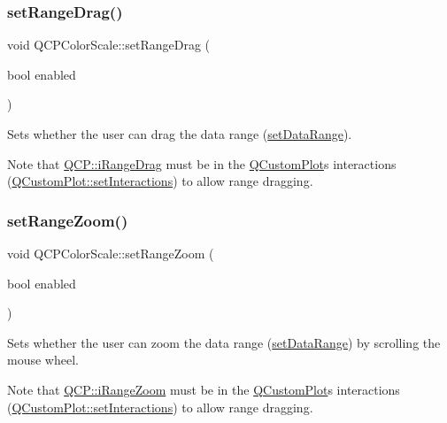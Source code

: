 \subsubsection{\texorpdfstring{set\+Range\+Drag()}{setRangeDrag()}}
{\footnotesize\ttfamily void Q\+C\+P\+Color\+Scale\+::set\+Range\+Drag (\begin{DoxyParamCaption}\item[{bool}]{enabled }\end{DoxyParamCaption})}

Sets whether the user can drag the data range (\hyperlink{class_q_c_p_color_scale_abe88633003a26d1e756aa74984587fef}{set\+Data\+Range}).

Note that \hyperlink{namespace_q_c_p_a2ad6bb6281c7c2d593d4277b44c2b037a2c4432b9aceafb94000be8d1b589ef18}{Q\+C\+P\+::i\+Range\+Drag} must be in the \hyperlink{class_q_custom_plot}{Q\+Custom\+Plot}\textquotesingle{}s interactions (\hyperlink{class_q_custom_plot_a5ee1e2f6ae27419deca53e75907c27e5}{Q\+Custom\+Plot\+::set\+Interactions}) to allow range dragging. \mbox{\label{class_q_c_p_color_scale_a96bd60fb6317ad6821841b539c93eeeb}} 
\subsubsection{\texorpdfstring{set\+Range\+Zoom()}{setRangeZoom()}}
{\footnotesize\ttfamily void Q\+C\+P\+Color\+Scale\+::set\+Range\+Zoom (\begin{DoxyParamCaption}\item[{bool}]{enabled }\end{DoxyParamCaption})}

Sets whether the user can zoom the data range (\hyperlink{class_q_c_p_color_scale_abe88633003a26d1e756aa74984587fef}{set\+Data\+Range}) by scrolling the mouse wheel.

Note that \hyperlink{namespace_q_c_p_a2ad6bb6281c7c2d593d4277b44c2b037abee1e94353525a636aeaf0ba32b72e14}{Q\+C\+P\+::i\+Range\+Zoom} must be in the \hyperlink{class_q_custom_plot}{Q\+Custom\+Plot}\textquotesingle{}s interactions (\hyperlink{class_q_custom_plot_a5ee1e2f6ae27419deca53e75907c27e5}{Q\+Custom\+Plot\+::set\+Interactions}) to allow range dragging. \mbox{\label{class_q_c_p_color_scale_a1bf9bdb291927c422dd66b404b206f1f}} 
